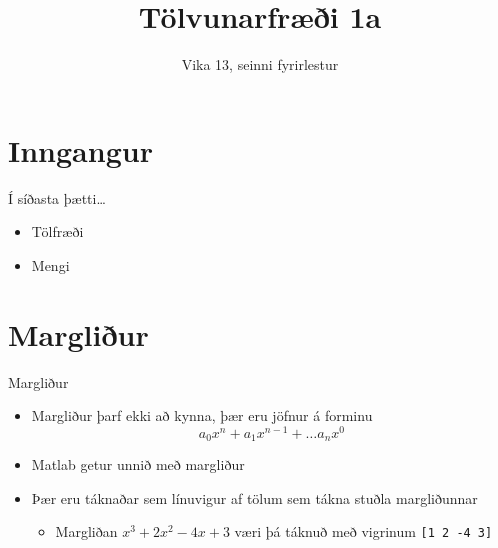 \documentclass{beamer}
\title{Tölvunarfræði 1a}
\subtitle{Vika 13, seinni fyrirlestur}
\begin{document}
\begin{frame}
\titlepage
\end{frame}

\section{Inngangur}

\begin{frame}{Í síðasta þætti\ldots}
\begin{itemize}
 \item Tölfræði
 \item Mengi
\end{itemize}
\end{frame}

\section{Margliður}

\begin{frame}[fragile]{Margliður}
\begin{itemize}
 \item Margliður þarf ekki að kynna, þær eru jöfnur á forminu
\[
 a_0x^n + a_1x^{n-1} + \ldots a_nx^0
\]
 \item Matlab getur unnið með margliður
 \item Þær eru táknaðar sem línuvigur af tölum sem tákna stuðla margliðunnar
 \begin{itemize}
  \item Margliðan $x^3 + 2x^2 -4x +3$ væri þá táknuð með vigrinum \verb|[1 2 -4 3]|
 \end{itemize} 
\end{itemize}
\end{frame}
\end{document}
